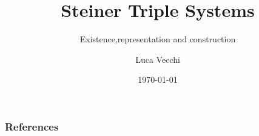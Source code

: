 \documentclass{beamer}
\title{Steiner Triple Systems}
\subtitle{Existence,representation and construction}
\author{Luca Vecchi}
\institute{University of Milan}
\date{\today}
\begin{document}
	\begin{frame}
	\titlepage
	\end{frame}
	
	
	
	
	
	
	
	
	
	


	\begin{frame}
	\frametitle{References}
	\printbibliography
	\end{frame}
\end{document}
